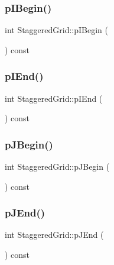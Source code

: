 \subsubsection{\texorpdfstring{pIBegin()}{pIBegin()}}
{\footnotesize\ttfamily int Staggered\+Grid\+::p\+I\+Begin (\begin{DoxyParamCaption}{ }\end{DoxyParamCaption}) const}

\mbox{\label{classStaggeredGrid_a34f16fdf87971fe84ffc3c84722bb2c7}} 
\subsubsection{\texorpdfstring{pIEnd()}{pIEnd()}}
{\footnotesize\ttfamily int Staggered\+Grid\+::p\+I\+End (\begin{DoxyParamCaption}{ }\end{DoxyParamCaption}) const}

\mbox{\label{classStaggeredGrid_ae4c9ba16c5635dc1ffaa264fbcc3e034}} 
\subsubsection{\texorpdfstring{pJBegin()}{pJBegin()}}
{\footnotesize\ttfamily int Staggered\+Grid\+::p\+J\+Begin (\begin{DoxyParamCaption}{ }\end{DoxyParamCaption}) const}

\mbox{\label{classStaggeredGrid_ad9928ee522eedb7d7fd48ca0b92f2795}} 
\subsubsection{\texorpdfstring{pJEnd()}{pJEnd()}}
{\footnotesize\ttfamily int Staggered\+Grid\+::p\+J\+End (\begin{DoxyParamCaption}{ }\end{DoxyParamCaption}) const}

\mbox{\label{classStaggeredGrid_ae2e215ba6d87dfc41beb42649ba1b799}} 
